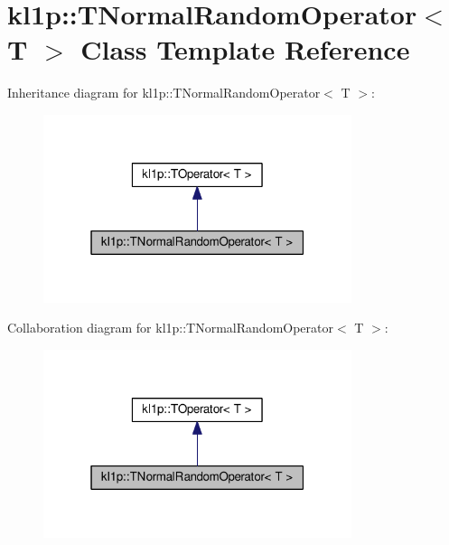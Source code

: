 \hypertarget{classkl1p_1_1TNormalRandomOperator}{}\section{kl1p\+:\+:T\+Normal\+Random\+Operator$<$ T $>$ Class Template Reference}
\label{classkl1p_1_1TNormalRandomOperator}


Inheritance diagram for kl1p\+:\+:T\+Normal\+Random\+Operator$<$ T $>$\+:
\nopagebreak
\begin{figure}[H]
\begin{center}
\leavevmode
\includegraphics[width=256pt]{classkl1p_1_1TNormalRandomOperator__inherit__graph}
\end{center}
\end{figure}


Collaboration diagram for kl1p\+:\+:T\+Normal\+Random\+Operator$<$ T $>$\+:
\nopagebreak
\begin{figure}[H]
\begin{center}
\leavevmode
\includegraphics[width=256pt]{classkl1p_1_1TNormalRandomOperator__coll__graph}
\end{center}
\end{figure}
